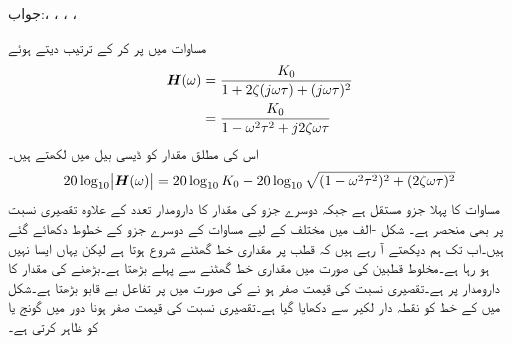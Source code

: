 جواب:، ، ، ،\\

مساوات  میں  پر کر کے ترتیب دیتے ہوئے
\begin{align*}
{\ensuremath{{\boldsymbol{H}}}}(\omega)&=\frac{K_0}{1+2\zeta (j\omega \tau)+(j\omega \tau)^2}\\
&=\frac{K_0}{1-\omega^2\tau^2 +j 2\zeta\omega \tau}
\end{align*}
اس کی مطلق مقدار کو ڈیسی بیل میں لکھتے ہیں۔
\begin{align}\label{مساوات_تعددی_تقصیری_جزو}
20\log_{10}\abs{{{\boldsymbol{H}}}(\omega)}=20\log_{10} K_0 -20\log_{10}\sqrt{(1- \omega^2\tau^2)^2+(2\zeta\omega\tau)^2}
\end{align}
مساوات  کا پہلا جزو مستقل ہے جبکہ دوسرے جزو کی مقدار کا دارومدار تعدد کے علاوہ تقصیری نسبت  پر بھی منحصر  ہے۔ شکل -الف میں مختلف  کے  لیے مساوات  کے  دوسرے جزو کے خطوط دکھائے گئے ہیں۔اب تک ہم دیکھتے آ رہے ہیں کہ قطب پر مقداری خط گھٹنے شروع ہوتا ہے لیکن یہاں ایسا نہیں ہو رہا ہے۔مخلوط قطبین کی صورت میں مقداری خط گھٹنے سے پہلے بڑھتا ہے۔بڑھنے کی مقدار کا دارومدار  پر ہے۔تقصیری نسبت  کی قیمت صفر  ہو نے کی صورت میں  پر تفاعل بے قابو بڑھتا ہے۔شکل میں  کے خط کو نقطہ دار لکیر سے دکھایا گیا ہے۔تقصیری نسبت  کی قیمت صفر ہونا دور میں گونج یا  کو ظاہر کرتی ہے۔

